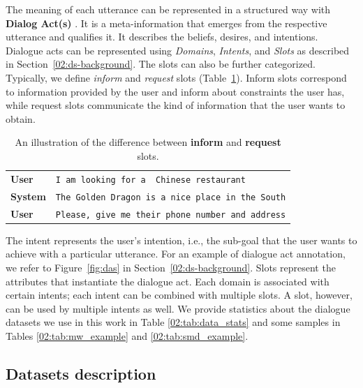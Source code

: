 \begin{enumerate}
The meaning of each utterance can be represented in a structured way with \textbf{Dialog Act(s)} \cite{Weisser2016}.
It is a meta-information that emerges from the respective utterance and qualifies it. It describes the beliefs, desires, and intentions.
Dialogue acts can be represented using \emph{Domains}, \emph{Intents}, and \emph{Slots} as described in Section~\ref{02:ds-background}.
The slots can also be further categorized.
Typically, we define \emph{inform} and \emph{request} slots (Table~\ref{02:tab:inf-req}). Inform slots correspond to information provided by the user and inform about constraints the user has, while request slots communicate the kind of information that the user wants to obtain.
\begin{table}[tp]
    \centering
    \begin{tabular}{l|l}
    \toprule
         \textbf{User} & \texttt{I am looking for a {\color{cyan!80!yellow!80!black!100 } Chinese} restaurant} \\
         \textbf{System} & \texttt{The Golden Dragon is a nice place in the South} \\
         \textbf{User} & \texttt{Please, give me their {\color{orange!50!yellow!90!black!100!}phone number} and {\color{orange!50!yellow!90!black!100!}address}} \\
         \bottomrule
    \end{tabular}
    \caption{An illustration of the difference between {\color{cyan!80!yellow!80!black!100 }\textbf{inform}} and {\color{orange!50!yellow!90!black!100!}\textbf{request}} slots.}
    \label{02:tab:inf-req}
\end{table}
The intent represents the user's intention, i.e., the sub-goal that the user wants to achieve with a particular utterance.
For an example of dialogue act annotation, we refer to Figure~\ref{fig:das} in Section~\ref{02:ds-background}.
Slots represent the attributes that instantiate the dialogue act.
Each domain is associated with certain intents; each intent can be combined with multiple slots. A slot, however, can be used by multiple intents as well.
We provide statistics about the dialogue datasets we use in this work in Table \ref{02:tab:data_stats} and some samples in Tables \ref{02:tab:mw_example} and \ref{02:tab:smd_example}.
\end{enumerate} 

\subsection{Datasets description}
\label{02:sec:data-desc}
